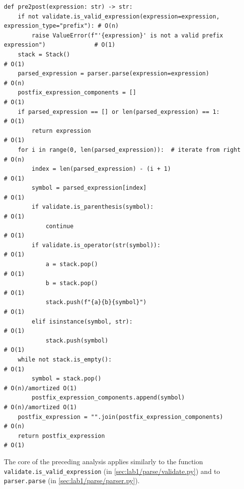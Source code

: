 \documentclass[10pt,letterpaper,final]{report}
\begin{document}
\begin{verbatim}
def pre2post(expression: str) -> str:
    if not validate.is_valid_expression(expression=expression, expression_type="prefix"): # O(n)
        raise ValueError(f"'{expression}' is not a valid prefix expression")              # O(1)
    stack = Stack()                                                                       # O(1)
    parsed_expression = parser.parse(expression=expression)                               # O(n)
    postfix_expression_components = []                                                    # O(1)
    if parsed_expression == [] or len(parsed_expression) == 1:                            # O(1)
        return expression                                                                 # O(1)
    for i in range(0, len(parsed_expression)):  # iterate from right                      # O(n)
        index = len(parsed_expression) - (i + 1)                                          # O(1)
        symbol = parsed_expression[index]                                                 # O(1)
        if validate.is_parenthesis(symbol):                                               # O(1)
            continue                                                                      # O(1)
        if validate.is_operator(str(symbol)):                                             # O(1)
            a = stack.pop()                                                               # O(1)
            b = stack.pop()                                                               # O(1)
            stack.push(f"{a}{b}{symbol}")                                                 # O(1)
        elif isinstance(symbol, str):                                                     # O(1)
            stack.push(symbol)                                                            # O(1)
    while not stack.is_empty():                                                           # O(1)
        symbol = stack.pop()                                                              # O(n)/amortized O(1)
        postfix_expression_components.append(symbol)                                      # O(n)/amortized O(1)
    postfix_expression = "".join(postfix_expression_components)                           # O(n)
    return postfix_expression                                                             # O(1)
\end{verbatim}

The core of the preceding analysis applies similarly to the function \texttt{validate.is_valid_expression} (in \autoref{sec:lab1/parse/validate.py}) and to \texttt{parser.parse} (in \autoref{sec:lab1/parse/parser.py}).
\end{document}
